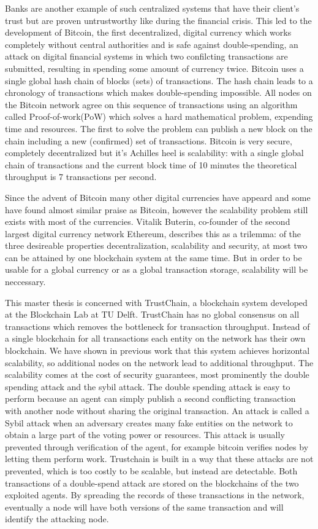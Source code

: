 Banks are another example of such centralized systems that have their client's trust but are proven
untrustworthy like during the financial crisis. This led to the development of Bitcoin, the first
decentralized, digital currency which works completely without central authorities and is safe 
against double-spending, an attack on digital financial systems in which two confilcting 
transactions are submitted, resulting in spending some amount of currency twice. Bitcoin uses a 
single global hash chain of blocks (sets) of transactions. The hash chain leads to a chronology 
of transactions which makes double-spending impossible. All nodes on the Bitcoin network agree on
this sequence of transactions using an algorithm called Proof-of-work(PoW) which solves a hard
mathematical problem, expending time and resources. The first to solve the problem can publish a
new block on the chain including a new (confirmed) set of transactions. Bitcoin is very secure, 
completely decentralized but it's Achilles heel is scalability: with a single global chain of 
transactions and the current block time of 10 minutes the theoretical throughput is 7 transactions
per second. 

Since the advent of Bitcoin many other digital currencies have appeard and some have found almost
similar praise as Bitcoin, however the scalability problem still exists with most of the currencies.
Vitalik Buterin, co-founder of the second largest digital currency network Ethereum, describes
this as a trilemma: of the three desireable properties decentralization, scalability and security,
at most two can be attained by one blockchain system at the same time. But in order to be usable 
for a global currency or as a global transaction storage, scalability will be neccessary.

This master thesis is concerned with TrustChain, a blockchain system developed at the Blockchain 
Lab at TU Delft. TrustChain has no global consensus on all transactions which removes the 
bottleneck for transaction throughput. Instead of a single blockchain for all transactions each 
entity on the network has their own blockchain. We have shown in previous work that this system 
achieves horizontal scalability, so additional nodes on the network lead to additional throughput.
The scalability comes at the cost of security guarantees, most prominently the double spending 
attack and the sybil attack. The double spending attack is easy to perform because an agent can 
simply publish a second conflicting transaction with another node without sharing the original 
transaction. An attack is called a Sybil attack when an adversary creates many fake entities on the
network to obtain a large part of the voting power or resources. This attack is usually prevented 
through verification of the agent, for example bitcoin verifies nodes by letting them perform work.
Trustchain is built in a way that these attacks are not prevented, which is too costly to be 
scalable, but instead are detectable. Both transactions of a double-spend attack are stored on the
blockchains of the two exploited agents. By spreading the records of these transactions in the 
network, eventually a node will have both versions of the same transaction and will identify the
attacking node.

